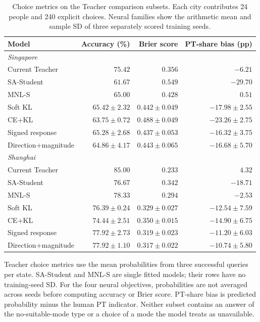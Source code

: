 \begin{table}[pos=htbp]
\centering\footnotesize
\caption{Choice metrics on the Teacher comparison subsets. Each city contributes 24 people and 240 explicit choices. Neural families show the arithmetic mean and sample SD of three separately scored training seeds.}
\label{tab:teacher_subset_choices}
\setlength{\tabcolsep}{3pt}
\renewcommand{\arraystretch}{1.15}
\begin{tabular*}{\linewidth}{@{\extracolsep{\fill}}lrrr@{}}
\toprule
Model & Accuracy (\%) & Brier score & PT-share bias (pp) \\
\midrule
\multicolumn{4}{l}{\textit{Singapore}} \\
Current Teacher & $75.42$ & $0.356$ & $-6.21$ \\
SA-Student & $61.67$ & $0.549$ & $-29.70$ \\
MNL-S & $65.00$ & $0.428$ & $0.51$ \\
Soft KL & $65.42\pm 2.32$ & $0.442\pm 0.049$ & $-17.98\pm 2.55$ \\
CE+KL & $63.75\pm 0.72$ & $0.488\pm 0.049$ & $-23.26\pm 2.75$ \\
Signed response & $65.28\pm 2.68$ & $0.437\pm 0.053$ & $-16.32\pm 3.75$ \\
Direction+magnitude & $64.86\pm 4.17$ & $0.443\pm 0.065$ & $-16.68\pm 5.70$ \\
\midrule
\multicolumn{4}{l}{\textit{Shanghai}} \\
Current Teacher & $85.00$ & $0.233$ & $4.32$ \\
SA-Student & $76.67$ & $0.342$ & $-18.71$ \\
MNL-S & $78.33$ & $0.294$ & $-2.53$ \\
Soft KL & $76.39\pm 0.24$ & $0.329\pm 0.027$ & $-12.54\pm 7.59$ \\
CE+KL & $74.44\pm 2.51$ & $0.350\pm 0.015$ & $-14.90\pm 6.75$ \\
Signed response & $77.92\pm 2.73$ & $0.319\pm 0.023$ & $-11.20\pm 6.03$ \\
Direction+magnitude & $77.92\pm 1.10$ & $0.317\pm 0.022$ & $-10.74\pm 5.80$ \\
\bottomrule
\end{tabular*}
\par\smallskip\begin{minipage}{\linewidth}\footnotesize
Teacher choice metrics use the mean probabilities from three successful queries per state. SA-Student and MNL-S are single fitted models; their rows have no training-seed SD. For the four neural objectives, probabilities are not averaged across seeds before computing accuracy or Brier score. PT-share bias is predicted probability minus the human PT indicator. Neither subset contains an answer of the no-suitable-mode type or a choice of a mode the model treats as unavailable.
\end{minipage}
\end{table}
